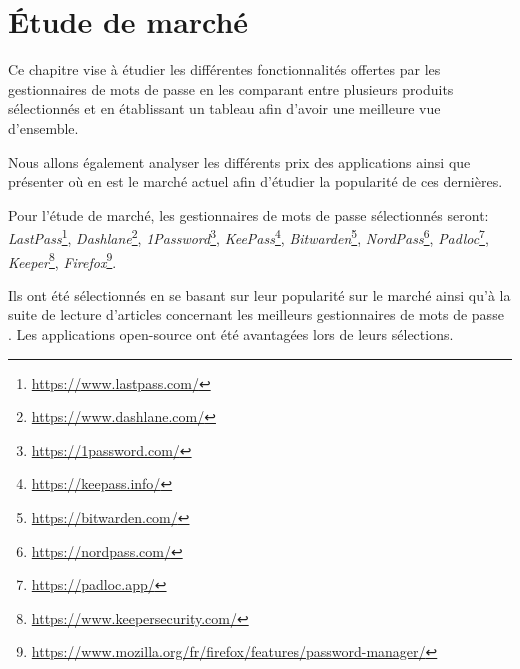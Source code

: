 


\chapter{Étude de marché}
\label{ch:etude_marche}
Ce chapitre vise à étudier les différentes fonctionnalités offertes par les gestionnaires de mots de passe en les comparant entre plusieurs produits sélectionnés et en établissant un tableau afin d'avoir une meilleure vue d'ensemble.

Nous allons également analyser les différents prix des applications ainsi que présenter où en est le marché actuel afin d'étudier la popularité de ces dernières.

Pour l'étude de marché, les gestionnaires de mots de passe sélectionnés seront: \textit{LastPass}\footnote{\href{https://www.lastpass.com/}{https://www.lastpass.com/}}, \textit{Dashlane}\footnote{\href{https://www.dashlane.com/}{https://www.dashlane.com/}}, \textit{1Password}\footnote{\href{https://1password.com/}{https://1password.com/}}, \textit{KeePass}\footnote{\href{https://keepass.info/}{https://keepass.info/}}, \textit{Bitwarden}\footnote{\href{https://bitwarden.com/}{https://bitwarden.com/}}, \textit{NordPass}\footnote{\href{https://nordpass.com/}{https://nordpass.com/}}, \textit{Padloc}\footnote{\href{https://padloc.app/}{https://padloc.app/}}, \textit{Keeper}\footnote{\href{https://www.keepersecurity.com/}{https://www.keepersecurity.com/}}, \textit{Firefox}\footnote{\href{https://www.mozilla.org/fr/firefox/features/password-manager/}{https://www.mozilla.org/fr/firefox/features/password-manager/}}.

Ils ont été sélectionnés en se basant sur leur popularité sur le marché ainsi qu'à la suite de lecture d'articles concernant les meilleurs gestionnaires de mots de passe \cite{BPM22}\cite{gallagher19}\cite{MSPM22}\cite{PM22}. Les applications open-source ont été avantagées lors de leurs sélections.
